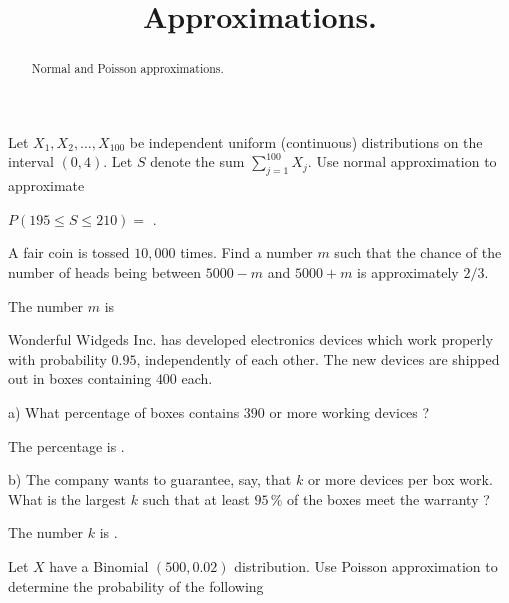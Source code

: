 \documentclass{ximera}
\title{Approximations.}
\begin{document}
\begin{abstract}
Normal and Poisson approximations.
\end{abstract}
\maketitle

Let $X_{1}, X_{2}, \dots, X_{100}$ be independent uniform (continuous) distributions on the interval $(0,4)$. Let $S$ denote the sum $\sum_{j=1}^{100} X_{j}$. Use normal approximation to approximate

\begin{question} 
     \begin{solution}
          $P(195\leq S \leq 210) = $  .
     \end{solution}
\end{question}

A fair coin is tossed $10,000$ times. Find a number $m$ such that the chance of the number of heads being between $5000-m$ and $5000+m$ is approximately $2/3$.

\begin{question}
     \begin{solution}
          The number $m$ is 
     \end{solution}
\end{question}

Wonderful Widgeds Inc. has developed electronics devices which work properly with probability $0.95$, independently of each other. The new devices are shipped out in boxes containing $400$ each.

\begin{question}
     a) What percentage of boxes contains $390$ or more working devices ?
     \begin{solution}
           The percentage is .
     \end{solution}
\end{question}

\begin{question}
     b) The company wants to guarantee, say, that $k$ or more devices per box work. What is the largest $k$ such that at least $95\,\%$ of the boxes meet the warranty ?
     \begin{solution}
           The number $k$ is .
     \end{solution}
\end{question}

Let $X$ have a Binomial $(500,0.02)$ distribution. Use Poisson approximation to determine the probability of the following
\end{document}
